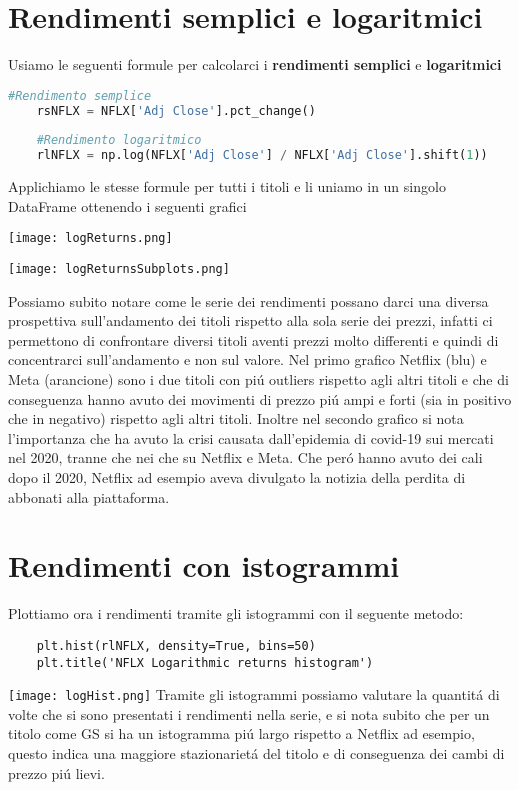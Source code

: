 \documentclass{report}
\begin{document}
\section{Rendimenti semplici e logaritmici}
Usiamo le seguenti formule per calcolarci i \textbf{rendimenti semplici} e \textbf{logaritmici}
\begin{lstlisting}[language=python]
    #Rendimento semplice
    rsNFLX = NFLX['Adj Close'].pct_change()
    
    #Rendimento logaritmico
    rlNFLX = np.log(NFLX['Adj Close'] / NFLX['Adj Close'].shift(1))
\end{lstlisting}
Applichiamo le stesse formule per tutti i titoli e li uniamo in un singolo DataFrame ottenendo i seguenti grafici

\texttt{[image: logReturns.png]}

\texttt{[image: logReturnsSubplots.png]}

\noindent Possiamo subito notare come le serie dei rendimenti possano darci una diversa prospettiva sull'andamento dei titoli rispetto alla sola serie dei prezzi, infatti ci permettono di confrontare diversi titoli aventi prezzi molto differenti e quindi di concentrarci sull'andamento e non sul valore. Nel primo grafico Netflix (blu) e Meta (arancione) sono i due titoli con piú outliers rispetto agli altri titoli e che di conseguenza hanno avuto dei movimenti di prezzo  piú ampi e forti (sia in positivo che in negativo) rispetto agli altri titoli. Inoltre nel secondo grafico si nota l'importanza che ha avuto la crisi causata dall'epidemia di covid-19 sui mercati nel 2020, tranne che nei che su Netflix e Meta. Che peró hanno avuto dei cali dopo il 2020, Netflix ad esempio aveva divulgato la notizia della perdita di abbonati alla piattaforma.
\section{Rendimenti con istogrammi}
Plottiamo ora i rendimenti tramite gli istogrammi con il seguente metodo:
\begin{lstlisting}
    plt.hist(rlNFLX, density=True, bins=50)
    plt.title('NFLX Logarithmic returns histogram')
\end{lstlisting}

\texttt{[image: logHist.png]}
Tramite gli istogrammi possiamo valutare la quantitá di volte che si sono presentati i rendimenti nella serie, e si nota subito che per un titolo come GS si ha un istogramma piú largo rispetto a Netflix ad esempio, questo indica una maggiore stazionarietá del titolo e di conseguenza dei cambi di prezzo piú lievi.
\end{document}
